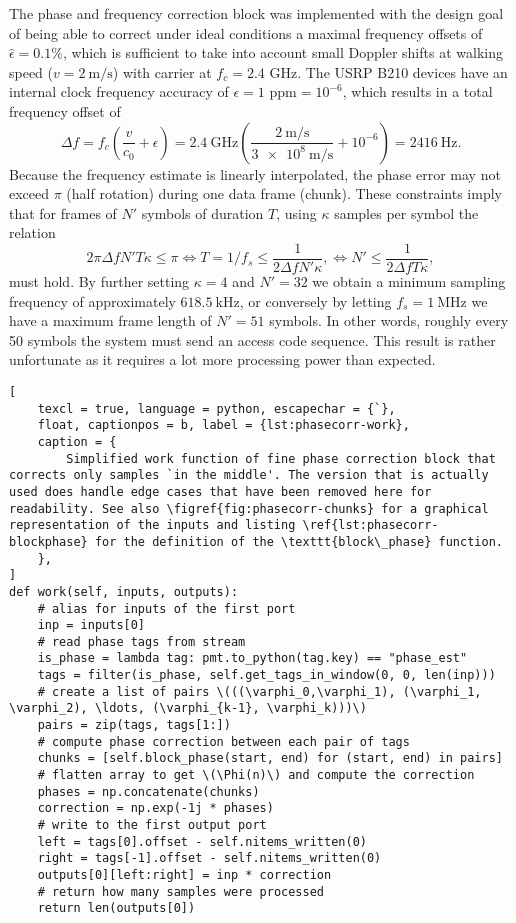 The phase and frequency correction block was implemented with the design goal of being able to correct under ideal conditions a maximal frequency offsets of \(\hat{\epsilon} = 0.1\%\), which is sufficient to take into account small Doppler shifts at walking speed (\(v = \SI{2}{\meter\per\second}\)) with carrier at \(f_c = 2.4\) GHz. The USRP B210 devices have an internal clock frequency accuracy of \(\epsilon = 1\text{ ppm} = 10^{-6}\), which results in a total frequency offset of
\begin{equation}
	\Delta f = f_c \left( \frac{v}{c_0} + \epsilon \right)
	= \SI{2.4}{\giga\hertz} \left(
		\frac{\SI{2}{\meter\per\second}}{\SI{3e8}{\meter\per\second}} + 10^{-6} 
	\right) = \SI{2416}{\hertz}.
\end{equation}
Because the frequency estimate is linearly interpolated, the phase error may not exceed \(\pi\) (half rotation) during one data frame (chunk). These constraints imply that for frames of \(N'\) symbols of duration \(T\), using \(\kappa\) samples per symbol the relation
\begin{equation}
	2\pi\Delta f N' T \kappa \leq \pi
	\iff T = 1/f_s \leq \frac{1}{2\Delta f N' \kappa},
	\iff N' \leq \frac{1}{2\Delta f T \kappa},
\end{equation}
must hold. By further setting \(\kappa = 4\) and \(N' = 32\) we obtain a minimum sampling frequency of approximately \(\SI{618.5}{\kilo\hertz}\), or conversely by letting \(f_s = \SI{1}{\mega\hertz}\) we have a maximum frame length of \(N' = 51\) symbols. In other words, roughly every 50 symbols the system must send an access code sequence. This result is rather unfortunate as it requires a lot more processing power than expected.

\begin{lstlisting}[
	texcl = true, language = python, escapechar = {`},
	float, captionpos = b, label = {lst:phasecorr-work},
	caption = {
		Simplified work function of fine phase correction block that corrects only samples `in the middle'. The version that is actually used does handle edge cases that have been removed here for readability. See also \figref{fig:phasecorr-chunks} for a graphical representation of the inputs and listing \ref{lst:phasecorr-blockphase} for the definition of the \texttt{block\_phase} function.
	},
]
def work(self, inputs, outputs):
	# alias for inputs of the first port
	inp = inputs[0]
	# read phase tags from stream
	is_phase = lambda tag: pmt.to_python(tag.key) == "phase_est"
	tags = filter(is_phase, self.get_tags_in_window(0, 0, len(inp)))
	# create a list of pairs \(((\varphi_0,\varphi_1), (\varphi_1, \varphi_2), \ldots, (\varphi_{k-1}, \varphi_k)))\)
	pairs = zip(tags, tags[1:])
	# compute phase correction between each pair of tags
	chunks = [self.block_phase(start, end) for (start, end) in pairs]
	# flatten array to get \(\Phi(n)\) and compute the correction
	phases = np.concatenate(chunks)
	correction = np.exp(-1j * phases) 
	# write to the first output port
	left = tags[0].offset - self.nitems_written(0)
	right = tags[-1].offset - self.nitems_written(0)
	outputs[0][left:right] = inp * correction
	# return how many samples were processed
	return len(outputs[0])
\end{lstlisting}

